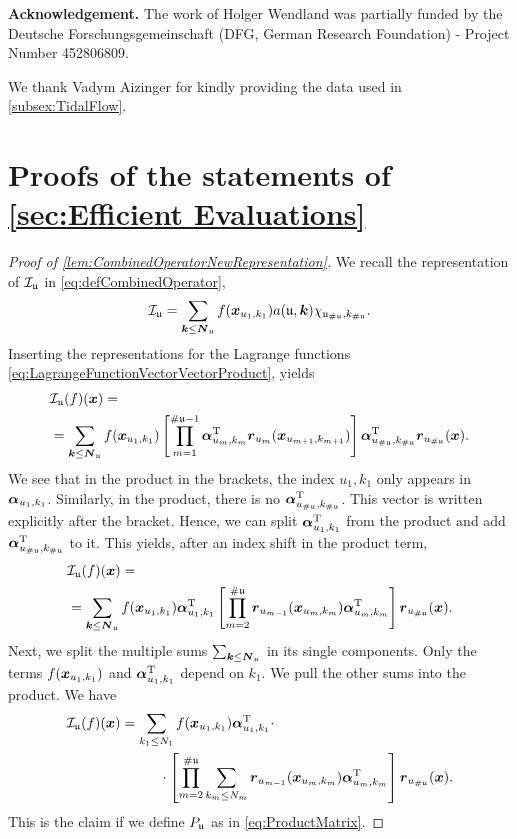 \documentclass[	a4paper, 
								11pt]{article}
\theoremstyle{plain}
\begin{document}
\bigskip\noindent
{\bf Acknowledgement.}
The work of Holger Wendland was partially funded by the Deutsche Forschungsgemeinschaft (DFG, German Research Foundation) - Project Number 452806809.

We thank Vadym Aizinger for kindly providing the data used in \cref{subsex:TidalFlow}.

\newpage
\appendix

\section{Proofs of the statements of \cref{sec:Efficient
Evaluations}}\label{app:Proofs}


\begin{proof} [Proof of \cref{lem:CombinedOperatorNewRepresentation}]
 We recall the representation of $ \mathcal{I}_{\mathfrak{u}} $ in 
 \eqref{eq:defCombinedOperator},
 \begin{align*}
  \mathcal{I}_{\mathfrak{u}} = \sum_{\boldsymbol{k} \leq \boldsymbol{N}_{\mathfrak{u}}} f(\boldsymbol{x}_{u_1,k_1}) a(\mathfrak{u},\boldsymbol{k}) 
\chi_{\mathfrak{u}_{\# \mathfrak{u}},k_{\# \mathfrak{u}}}.
 \end{align*}
 Inserting the representations for the Lagrange functions \eqref{eq:LagrangeFunctionVectorVectorProduct}, yields
 \begin{align*}
  &\mathcal{I}_{\mathfrak{u}}(f)(\boldsymbol{x}) =\\
  &= \sum_{\boldsymbol{k} \leq \boldsymbol{N}_{\mathfrak{u}}} f(\boldsymbol{x}_{u_1, k_1})
  \left[ \prod_{m=1}^{\# \mathfrak{u} - 1} \boldsymbol{\alpha}^{\text{T}}_{u_m,k_m} \boldsymbol{r}_
  {u_m}(\boldsymbol{x}_{u_{m+1},k_{m+1}}) \right] \boldsymbol{\alpha}^{\text{T}}_{u_{\#\mathfrak{u}},
  k_{\#\mathfrak{u}}} \boldsymbol{r}_{u_{\#\mathfrak{u}}} (\boldsymbol{x}).
 \end{align*}
 We see that in the product in the brackets, the index $ u_1,k_1 $ only 
 appears in $ \boldsymbol{\alpha}_{u_1,k_1} $. Similarly, in the product, there is no
 $ \boldsymbol{\alpha}^{\text{T}}_{u_{\#\mathfrak{u}},k_{\#\mathfrak{u}}} $. This vector is written 
 explicitly after the bracket. Hence, we can split $ \boldsymbol{\alpha}^{\text{T}}
 _{u_1,k_1} $ from the product and add $ \boldsymbol{\alpha}^{\text{T}}
 _{u_{\#\mathfrak{u}},k_{\#\mathfrak{u}}} $ to it. This yields,
 after an index shift in the product term,
 \begin{align*}
  &\mathcal{I}_{\mathfrak{u}}(f)(\boldsymbol{x}) =\\
  &= \sum_{\boldsymbol{k} \leq \boldsymbol{N}_{\mathfrak{u}}} f(\boldsymbol{x}_{u_1, k_1}) 
  \boldsymbol{\alpha}^{\text{T}}_{u_1,k_1}
  \left[ \prod_{m=2}^{\# \mathfrak{u}} \boldsymbol{r}_{u_{m-1}}(\boldsymbol{x}_{u_m,k_m}) 
  \boldsymbol{\alpha}^{\text{T}}_{u_m,k_m}\right] \boldsymbol{r}_{u_{\#\mathfrak{u}}} (\boldsymbol{x}).
 \end{align*}
 Next, we split the multiple sums $ \sum_{\boldsymbol{k} \leq \boldsymbol{N}_{\mathfrak{u}}} $ in its 
 single components. Only the terms $ f(\boldsymbol{x}_{u_1, k_1}) $ and $ 
  \boldsymbol{\alpha}^{\text{T}}_{u_1,k_1} $ depend on $ k_1 $. We pull the other sums
  into the product. We have
  \begin{align*}
&\cI_{\fraku}(f)(\xx) = 
\sum_{k_1 \leq N_1} f(\xx_{u_1, k_1}) \aalpha^{\transpose}_{u_1,k_1}\cdot \\
&\phantom{\cI_{\fraku}(f)(\xx) = \sum} \cdot
\left[ \prod_{m=2}^{\# \fraku} \sum_{k_m \leq N_m} \rr_{u_{m-1}}
  (\xx_{u_m,k_m})
   \aalpha^{\transpose}_{u_m,k_m}\right] 
  \rr_{u_{\#\fraku}} (\xx).
  \end{align*}
 This is the claim if we define $ P_{\mathfrak{u}} $ as in \eqref{eq:ProductMatrix}.
\end{proof}
\end{document}

